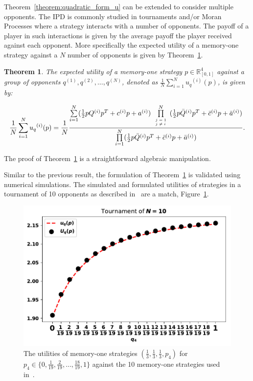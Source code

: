\documentclass[10pt]{article}
\newtheorem{theorem}{Theorem}
\begin{document}
Theorem~\ref{theorem:quadratic_form_u} can be extended to consider multiple
opponents. The IPD is commonly studied in tournaments and/or Moran Processes
where a strategy interacts with a number of opponents. The payoff of a player in
such interactions is given by the average payoff the player received against
each opponent. More specifically the expected utility of a memory-one strategy
against a \(N\) number of opponents is given by
Theorem~\ref{theorem:tournament_utility}.

\begin{theorem}\label{theorem:tournament_utility}
    The expected utility of a memory-one strategy \(p\in\mathbb{R}_{[0,1]}^4\)
    against a group of opponents \(q^{(1)}, q^{(2)}, \dots, q^{(N)}\), denoted
    as \(\frac{1}{N} \sum\limits_{i=1} ^ {N} {u_q}^{(i)} (p)\), is given by:

    \begin{equation}\label{eq:tournament_utility}
        \frac{1}{N} \sum\limits_{i=1} ^ {N} {u_q}^{(i)} (p) = \frac{1}{N}
        \frac{\sum\limits_{i=1} ^ {N} (\frac{1}{2} pQ^{(i)} p^T + c^{(i)} p + a^ {(i)})
        \prod\limits_{\tiny\begin{array}{l} j=1 \\ j \neq i \end{array}} ^
        N (\frac{1}{2} p\bar{Q}^{(i)} p^T + \bar{c}^{(i)} p + \bar{a}^ {(i)})}
        {\prod\limits_{i=1} ^ N (\frac{1}{2} p\bar{Q}^{(i)} p^T + \bar{c}^{(i)} p + \bar{a}^ {(i)})}.
    \end{equation}
\end{theorem}

The proof of Theorem~\ref{theorem:tournament_utility} is a straightforward algebraic
manipulation.

Similar to the previous result, the formulation of Theorem~\ref{theorem:tournament_utility}
is validated using numerical simulations. The simulated and formulated utilities
of strategies in a tournament of 10 opponents as described in~\cite{Stewart2012}
are a match, Figure~\ref{fig:stewart_plotkin_results}.

\begin{figure}[!htbp]
    \begin{center}
    \includegraphics[width=.5\linewidth]{img/Stewart_tournament_results.pdf}
    \caption{The utilities of memory-one strategies \((\frac{1}{3}, \frac{1}{3}, \frac{1}{3}, p_4)\) for
    \(p_4 \in \{0,  \frac{1}{19}, \frac{2}{19}, \dots, \frac{18}{19}, 1\}\)
    against the 10 memory-one strategies used in~\cite{Stewart2012}.}
    \label{fig:stewart_plotkin_results}
    \end{center}
\end{figure}
\end{document}
